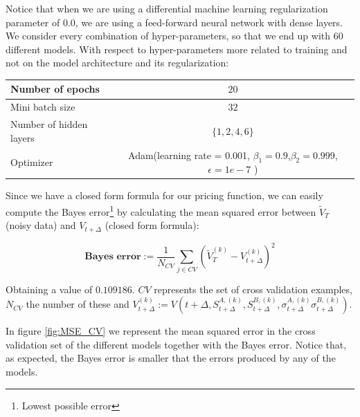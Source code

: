 Notice that when we are using a differential machine learning regularization parameter of 0.0, we are using a feed-forward neural network with dense layers. We consider every combination of hyper-parameters, so that we end up with $60$ different models. With respect to hyper-parameters more related to training and not on the model architecture and its regularization:


\begin{center}
\begin{tabular}{||l | c||} 
 \hline
 Number of epochs & $20$ \\
 \hline
 Mini batch size  & $32$  \\
 \hline
 Number of hidden layers  & $\{1 ,2 ,4 ,6\}$  \\
 \hline
 Optimizer &  Adam(learning rate = 0.001, $\beta_1=0.9$,$\beta_2=0.999$,$\epsilon=1e-7$ ) \\
  \hline
 \end{tabular}
\end{center}


Since we have a closed form formula for our pricing function, we can easily compute the Bayes error\footnote{Lowest possible error} by calculating the mean squared error between $\tilde{V}_{T}$ (noisy data) and $V_{t+\Delta}$ (closed form formula):

$$\textbf{Bayes error}:=\frac{1}{N_{CV}}\sum_{j\in CV}\left(\tilde{V}_{T}^{(k)}-V_{t+\Delta}^{(k)}\right)^2$$

Obtaining a value of $0.109186$. $CV$ represents the set of cross validation examples, $N_{CV}$ the number of these and $V_{t+\Delta}^{(k)} := V\left(t+\Delta, S_{t+\Delta}^{A,(k)}
,S_{t+\Delta}^{B,(k)}
,\sigma_{t+\Delta}^{A,(k)}
\sigma_{t+\Delta}^{B,(k)}\right)$.

In figure \ref{fig:MSE_CV} we represent the mean squared error in the cross validation set of the different models together with the Bayes error. Notice that, as expected, the Bayes error is smaller that the errors produced by any of the models.


